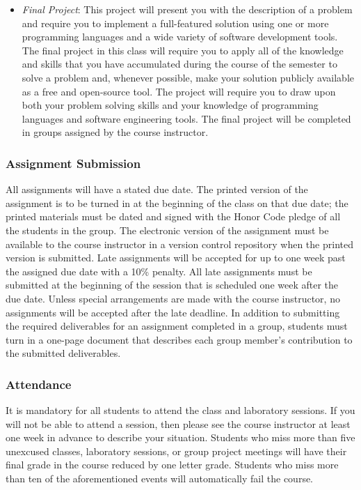 \begin{itemize}

	\item {\em Final Project}: This project will present you with the description of a problem and require you to
		implement a full-featured solution using one or more programming languages and a wide variety of software
		development tools.  The final project in this class will require you to apply all of the knowledge and skills
		that you have accumulated during the course of the semester to solve a problem and, whenever possible,
		make your solution publicly available as a free and open-source tool.  The project will require you to draw upon
		both your problem solving skills and your knowledge of programming languages and software engineering tools. The
		final project will be completed in groups assigned by the course instructor.
		
\end{itemize}

\subsubsection*{Assignment Submission}

All assignments will have a stated due date. The printed version of the assignment is to be turned in at the beginning
of the class on that due date; the printed materials must be dated and signed with the Honor Code pledge of all the
students in the group.  The electronic version of the assignment must be available to the course instructor in a version
control repository when the printed version is submitted. Late assignments will be accepted for up to one week past the
assigned due date with a 10\% penalty. All late assignments must be submitted at the beginning of the session that is
scheduled one week after the due date. Unless special arrangements are made with the course instructor, no assignments
will be accepted after the late deadline. In addition to submitting the required deliverables for an assignment
completed in a group, students must turn in a one-page document that describes each group member's contribution to the
submitted deliverables.  

\subsubsection*{Attendance}

It is mandatory for all students to attend the class and laboratory sessions. If you will not be able to attend a
session, then please see the course instructor at least one week in advance to describe your situation.  Students who
miss more than five unexcused classes, laboratory sessions, or group project meetings will have their final grade in the
course reduced by one letter grade. Students who miss more than ten of the aforementioned events will automatically fail
the course.

